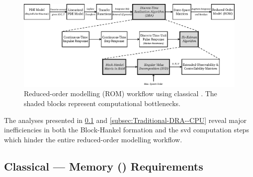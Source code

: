 \begin{figure}[!htbp]
    \centering
    \includegraphics[width=\textwidth]{traditional_dra.eps}
    \caption[%
    Reduced-order modelling (ROM) workflow using classical .
    ]%
    {%
        Reduced-order modelling (ROM) workflow using classical
        . The shaded blocks represent computational bottlenecks.
    }%
    \label{fig:traditional_ROM_Workflow}
\end{figure}

The    analyses     presented    in \cref{subsec:Traditional-DRA--Memory}    and
\cref{subsec:Traditional-DRA--CPU}  reveal  major  inefficiencies  in  both  the
Block-Hankel  formation and  the \gls{svd}  computation steps  which hinder  the
entire reduced-order modelling workflow.

\subsection{Classical  --- Memory () Requirements}\label{subsec:Traditional-DRA--Memory}




